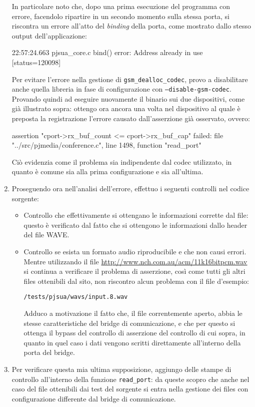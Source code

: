 \begin{enumerate}
	In particolare noto che, dopo una prima esecuzione del programma con
	errore, facendolo ripartire in un secondo momento sulla stessa porta,
	si riscontra un errore all'atto del \textit{binding} della porta, come
	mostrato dallo stesso output dell'applicazione:
	\begin{bash}
22:57:24.663   pjsua_core.c  bind() error: Address already in use [status=120098]
	\end{bash}
	
	Per evitare l'errore nella gestione di \texttt{\small gsm\_dealloc\_codec},
	provo a disabilitare anche quella libreria in fase di configurazione con 
	\texttt{\small --disable-gsm-codec}. Provando quindi ad eseguire nuovamente
	il binario sui due dispositivi, come già illustrato sopra: ottengo ora
	ancora una volta nel dispositivo al quale è preposta la registrazione
	l'errore causato dall'asserzione già osservato, ovvero:
        \begin{bash} 
assertion "cport->rx_buf_count <= cport->rx_buf_cap" failed: file "../src/pjmedia/conference.c", line 1498, function "read_port"
\end{bash}

	Ciò evidenzia come il problema sia indipendente dal codec utilizzato,
	in quanto è comune sia alla prima configurazione e sia all'ultima.
	
\item Proseguendo ora nell'analisi dell'errore, effettuo i seguenti controlli
	nel codice sorgente:
	\begin{itemize}
	\item Controllo che effettivamente si ottengano le informazioni corrette
		dal file: questo è verificato dal fatto che si 
		ottengono le informazioni dallo header del file WAVE.
	\item Controllo se esista  un formato audio riproducibile
		e che non causi errori. Mentre utilizzando il file
		\url{http://www.nch.com.au/acm/11k16bitpcm.wav} si continua
		a verificare il problema di asserzione, così come tutti gli altri
		files ottenibili dal sito, non riscontro alcun problema con 
		il file d'esempio:
		\begin{center}
		\texttt{\small \PJA/tests/pjsua/wavs/input.8.wav}
		\end{center}	
		Adduco a motivazione il fatto che, il file correntemente aperto,
		abbia le stesse caratteristiche del bridge di comunicazione, e 
		che per questo si ottenga il bypass del controllo di asserzione
		del controllo di cui sopra, in quanto in quel caso i dati vengono
		scritti direttamente all'interno della porta del bridge.
	\end{itemize}
\item Per verificare questa mia ultima supposizione, aggiungo delle stampe di 
	controllo all'interno della funzione \texttt{\small read\_port}: da queste
	scopro che anche nel caso del file ottenibili dai test del sorgente si 
	entra nella gestione dei files con configurazione differente dal bridge
	di comunicazione. 
	

\end{enumerate}

